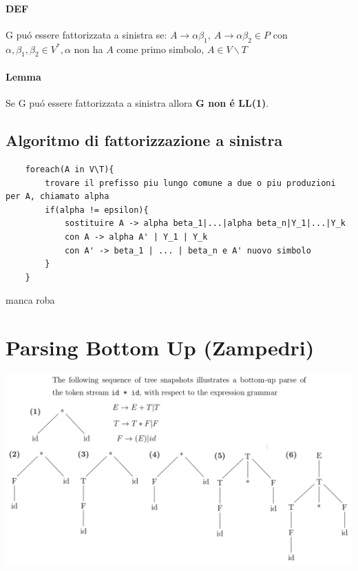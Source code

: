 \subsubsection{DEF}
G pu\'o essere fattorizzata a sinistra se:
$A \rightarrow \alpha \beta _1,\ A \rightarrow \alpha\beta _2 \in P$ con \\
$\alpha , \beta _1, \beta _2 \in V^*, \alpha $ non ha $A$ come primo simbolo, $A \in V\backslash T$

\subsubsection{Lemma}
Se G pu\'o essere fattorizzata a sinistra allora \textbf{G non \'e LL(1)}.

\section{Algoritmo di fattorizzazione a sinistra}
\begin{lstlisting}
    foreach(A in V\T){
        trovare il prefisso piu lungo comune a due o piu produzioni per A, chiamato alpha 
        if(alpha != epsilon){
            sostituire A -> alpha beta_1|...|alpha beta_n|Y_1|...|Y_k
            con A -> alpha A' | Y_1 | Y_k 
            con A' -> beta_1 | ... | beta_n e A' nuovo simbolo
        }
    }
\end{lstlisting}

manca roba

\chapter{Parsing Bottom Up (Zampedri)}
\begin{center}
    \includegraphics[scale=0.4]{Chapters/Img/c04_02.png}\\
\end{center}

